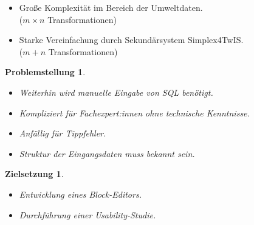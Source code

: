 \begin{frame}

  \begin{itemize}
    \item Große Komplexität im Bereich der Umweltdaten.\\($m \times n$ Transformationen)
    \item Starke Vereinfachung durch Sekundärsystem Simplex4TwIS.\\($m + n$ Transformationen)
  \end{itemize}

  \newtheorem{pro}{Problemstellung}
  \begin{pro}
    \begin{itemize}
      \item Weiterhin wird manuelle Eingabe von SQL benötigt.
      \item Kompliziert für Fachexpert:innen ohne technische Kenntnisse.
      \item Anfällig für Tippfehler.
      \item Struktur der Eingangsdaten muss bekannt sein.
    \end{itemize}
  \end{pro}


\end{frame}

\begin{frame}

  \newtheorem{goal}{Zielsetzung}
  \begin{goal}
    \begin{itemize}
      \item Entwicklung eines Block-Editors.
      \item Durchführung einer Usability-Studie.
    \end{itemize}
  \end{goal}

\end{frame}
